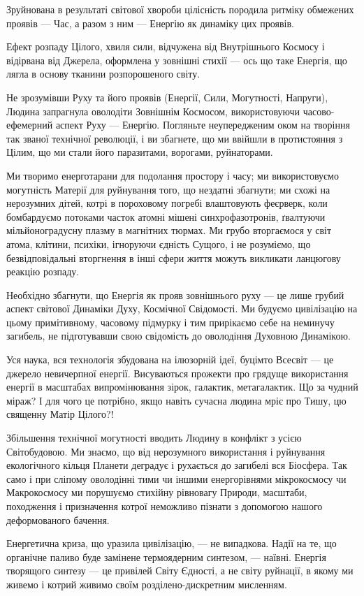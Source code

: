 Зруйнована в результаті світової хвороби цілісність породила ритміку обмежених
проявів — Час, а разом з ним — Енергію як динаміку цих проявів.

Ефект розпаду Цілого, хвиля сили, відчужена від Внутрішнього Космосу і
відірвана від Джерела, оформлена у зовнішні стихії — ось що таке Енергія, що
лягла в основу тканини розпорошеного світу.

Не зрозумівши Руху та його проявів (Енергії, Сили, Могутності, Напруги), Людина
запрагнула оволодіти Зовнішнім Космосом, використовуючи часово-ефемерний аспект
Руху — Енергію. Погляньте неупередженим оком на творіння так званої технічної
революції, і ви збагнете, що ми ввійшли в протистояння з Цілим, що ми стали
його паразитами, ворогами, руйнаторами.

Ми творимо енерготарани для подолання простору і часу; ми використовуємо
могутність Матерії для руйнування того, що нездатні збагнути; ми схожі на
нерозумних дітей, котрі в пороховому погребі влаштовують феєрверк, коли
бомбардуємо потоками часток атомні мішені синхрофазотронів, ґвалтуючи
мільйоноградусну плазму в магнітних тюрмах. Ми грубо вторгаємося у світ атома,
клітини, психіки, ігноруючи єдність Сущого, і не розуміємо, що безвідповідальні
вторгнення в інші сфери життя можуть викликати ланцюгову реакцію розпаду.

Необхідно збагнути, що Енергія як прояв зовнішнього руху — це лише грубий
аспект світової Динаміки Духу, Космічної Свідомості. Ми будуємо цивілізацію на
цьому примітивному, часовому підмурку і тим прирікаємо себе на неминучу
загибель, не підготувавши свою свідомість до оволодіння Духовною Динамікою.

Уся наука, вся технологія збудована на ілюзорній ідеї, буцімто Всесвіт — це
джерело невичерпної енергії. Висуваються прожекти про грядуще використання
енергії в масштабах випромінювання зірок, галактик, метагалактик. Що за чудний
міраж? І для чого це потрібно, якщо навіть сучасна людина мріє про Тишу, цю
священну Матір Цілого?!

Збільшення технічної могутності вводить Людину в конфлікт з усією Світобудовою.
Ми знаємо, що від нерозумного використання і руйнування екологічного кільця
Планети деградує і рухається до загибелі вся Біосфера. Так само і при сліпому
оволодінні тими чи іншими енергорівнями мікрокосмосу чи Макрокосмосу ми
порушуємо стихійну рівновагу Природи, масштаби, походження і призначення котрої
неможливо пізнати з допомогою нашого деформованого бачення.

Енергетична криза, що уразила цивілізацію, — не випадкова. Надії на те, що
органічне паливо буде замінене термоядерним синтезом, — наївні. Енергія
творящого синтезу — це привілей Світу Єдності, а не світу руйнації, в якому ми
живемо і котрий живимо своїм розділено-дискретним мисленням.

